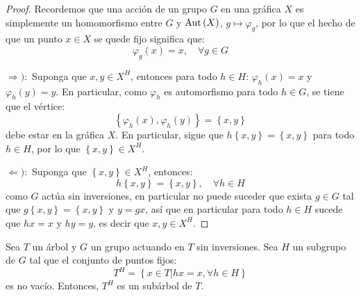 \documentclass[12pt]{report}
\theoremstyle{largebreak}
\newcommand{\Aut}[1]{\ensuremath{\textup{Aut}\left(#1\right)}}
\begin{document}
    \begin{proof}
        Recordemos que una acción de un grupo $G$ en una gráfica $X$ es simplemente un homomorfismo entre $G$ y $\Aut{X}$, $g\mapsto\varphi_g$, por lo que el hecho de que un punto $x\in X$ se quede fijo significa que:
        \begin{equation*}
            \varphi_g(x)=x,\quad\forall g\in G
        \end{equation*}

        $\Rightarrow):$ Suponga que $x,y\in X^H$, entonces para todo $h\in H$: $\varphi_h(x)=x$ y $\varphi_h(y)=y$. En particular, como $\varphi_h$ es automorfismo para todo $h\in G$, se tiene que el vértice:
        \begin{equation*}
            \left\{\varphi_h(x),\varphi_h(y) \right\}=\left\{x,y\right\}
        \end{equation*}
        debe estar en la gráfica $X$. En particular, sigue que $h\left\{x,y \right\}=\left\{x,y\right\}$ para todo $h\in H$, por lo que $\left\{x,y \right\}\in X^H$.

        $\Leftarrow):$ Suponga que $\left\{x,y\right\}\in X^H$, entonces:
        \begin{equation*}
            h\left\{x,y\right\}=\left\{x,y\right\},\quad\forall h\in H
        \end{equation*}
        como $G$ actúa sin inversiones, en particular no puede suceder que exista $g\in G$ tal que $g\left\{x,y \right\}=\left\{x,y \right\}$ y $y=gx$, así que en particular para todo $h\in H$ sucede que $hx=x$ y $hy=y$, es decir que $x,y\in X^H$.
    \end{proof}

    \begin{excer}
        Sea $T$ un árbol y $G$ un grupo actuando en $T$ sin inversiones. Sea $H$ un subgrupo de $G$ tal que el conjunto de puntos fijos:
        \begin{equation*}
            T^H=\left\{x\in T\Big|hx=x,\forall h\in H \right\}
        \end{equation*}
        es no vacío. Entonces, $T^H$ es un subárbol de $T$.
    \end{excer}
\end{document}
